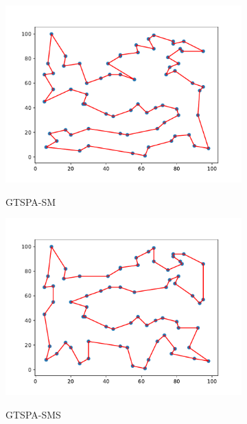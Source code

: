 \documentclass[12pt]{article}
\theoremstyle{plain}
\theoremstyle{definition}
\theoremstyle{remark}
\begin{document}
\begin{figure}[ht]
\begin{subfigure}{.5\textwidth}
		\includegraphics[scale = 0.44]{../../Implementation/gen/best_path_gtspasm_st70}
		\label{fig:best_path_gtspasm_st70}
		\caption{GTSPA-SM}
	\end{subfigure}%
	\begin{subfigure}{.5\textwidth}
		\centering
		\includegraphics[scale = 0.44]{../../Implementation/gen/best_path_gtspasms_st70}
		\label{fig:best_path_gtspasms_st70}
		\caption{GTSPA-SMS}
	\end{subfigure}
	\begin{subfigure}{.5\textwidth}
		\centering

\end{subfigure}
\end{figure}
\end{document}
